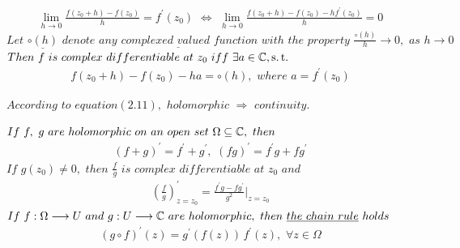 	\vspace*{2em}
	\begin{align}
		\lim_{h \to 0}{\frac{f(z_0 + h) - f(z_0)}{h}} = f^{'}(z_0) \,\, \Leftrightarrow \,\, \lim_{h \to 0}{\frac{f(z_0 + h) - f(z_0) - hf^{'}(z_0)}{h}} = 0
	\end{align}
	$Let \,\, \underline{\textbf{$\circ(h)$}} \,\, denote \,\, \underline{\textbf{$any \,\, complexed \,\, valued \,\, function$}} \,\, with \,\, the \,\, property \,\, \frac{\circ(h)}{h} \to 0 , \,\, as \,\, h \to 0$\\
	$Then \,\, f \,\, is \,\, complex \,\, differentiable \,\, at \,\, z_0 \,\, iff \,\, \exists a \in \mathbb{C} , \operatorname{s.t.}$
	\begin{align}
		f(z_0 + h) - f(z_0) - ha = \circ(h) , \,\, where \,\, a = f^{'}(z_0)
	\end{align}
	\begin{rmk}
		$According \,\, to \,\, equation(2.11) , \,\, holomorphic \,\, \Rightarrow \,\, continuity.$
	\end{rmk}

	\newpage
	\begin{proposition}\label{prop 2.2.1}
		$If \,\, f , \,\, g \,\, are \,\, holomorphic \,\, on \,\, an \,\, open \,\, set \,\, \Omega \subseteq \mathbb{C} , \,\, then$
		\begin{align}
			(f + g)^{'} = f^{'} + g^{'} , \,\, (fg)^{'} = f^{'}g + fg^{'}
		\end{align}
		$If \,\, g(z_0) \neq 0 , \,\, then \,\, \frac{f}{g} \,\, is \,\, complex \,\, differentiable \,\, at \,\, z_0 \,\, and$
		\begin{align}
			\left( \frac{f}{g} \right)^{'}_{z = z_0} = \frac{f^{'}g - fg^{'}}{g^2}\Big|_{z = z_0}
		\end{align}
		$If \,\, f : \Omega \longrightarrow U \,\, and \,\, g : U \longrightarrow \mathbb{C} \,\, are \,\, holomorphic , \,\, then \,\, \underline{\textbf{$the \,\, chain \,\, rule$}} \,\, holds$
		\begin{align}
			(g \circ f)^{'}(z) = g^{'}(f(z)) \, f^{'}(z) , \,\, \forall z \in \Omega
		\end{align}
	\end{proposition}

\newpage

